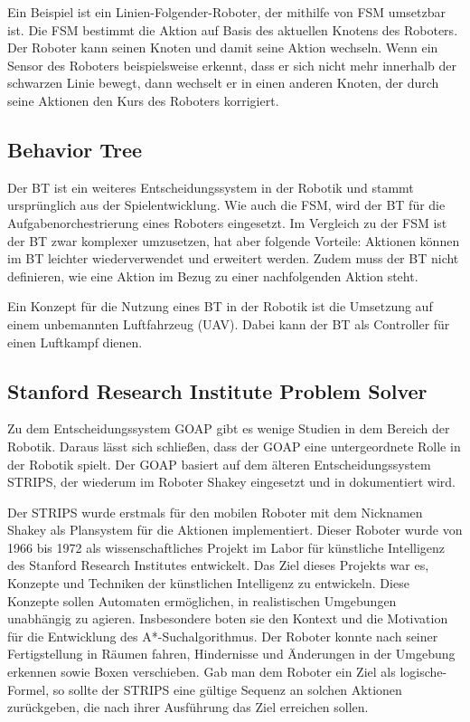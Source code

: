 Ein Beispiel ist ein Linien-Folgender-Roboter, der mithilfe von FSM umsetzbar ist. Die FSM bestimmt die Aktion auf Basis des aktuellen Knotens des Roboters. Der Roboter kann seinen Knoten und damit seine Aktion wechseln. Wenn ein Sensor des Roboters beispielsweise erkennt, dass er sich nicht mehr innerhalb der schwarzen Linie bewegt, dann wechselt er in einen anderen Knoten, der durch seine Aktionen den Kurs des Roboters korrigiert. \autocite{balogh2019using}

\subsection{Behavior Tree}
\label{chap:bt robotik}

Der BT ist ein weiteres Entscheidungssystem in der Robotik und stammt urspr\"{u}nglich aus der Spielentwicklung. Wie auch die FSM, wird der BT f\"{u}r die Aufgabenorchestrierung eines Roboters eingesetzt. Im Vergleich zu der FSM ist der BT zwar komplexer umzusetzen, hat aber folgende Vorteile: Aktionen k\"{o}nnen im BT leichter wiederverwendet und erweitert werden. Zudem muss der BT nicht definieren, wie eine Aktion im Bezug zu einer nachfolgenden Aktion steht. \autocite{iovino2022survey}

Ein Konzept f\"{u}r die Nutzung eines BT in der Robotik ist die Umsetzung auf einem unbemannten Luftfahrzeug (UAV). Dabei kann der BT als Controller f\"{u}r einen Luftkampf dienen. \autocite{ogren2012increasing}

\subsection{Stanford Research Institute Problem Solver}
\label{chap:strips}

Zu dem Entscheidungssystem GOAP gibt es wenige Studien in dem Bereich der Robotik. Daraus l\"{a}sst sich schlie\ss{}en, dass der GOAP eine untergeordnete Rolle in der Robotik spielt. Der GOAP basiert auf dem \"{a}lteren Entscheidungssystem STRIPS, der wiederum im Roboter Shakey eingesetzt und in \autocite{nilsson1984shakey} dokumentiert wird.

Der STRIPS wurde erstmals f\"{u}r den mobilen Roboter mit dem Nicknamen Shakey als Plansystem f\"{u}r die Aktionen implementiert. Dieser Roboter wurde von 1966 bis 1972 als wissenschaftliches Projekt im Labor f\"{u}r k\"{u}nstliche Intelligenz des Stanford Research Institutes entwickelt. Das Ziel dieses Projekts war es, Konzepte und Techniken der k\"{u}nstlichen Intelligenz zu entwickeln. Diese Konzepte sollen Automaten erm\"{o}glichen, in realistischen Umgebungen unabh\"{a}ngig zu agieren. Insbesondere boten sie den Kontext und die Motivation f\"{u}r die Entwicklung des A*-Suchalgorithmus. Der Roboter konnte nach seiner Fertigstellung in R\"{a}umen fahren, Hindernisse und \"{A}nderungen in der Umgebung erkennen sowie Boxen verschieben. Gab man dem Roboter ein Ziel als logische-Formel, so sollte der STRIPS eine g\"{u}ltige Sequenz an solchen Aktionen zur\"{u}ckgeben, die nach ihrer Ausf\"{u}hrung das Ziel erreichen sollen.

